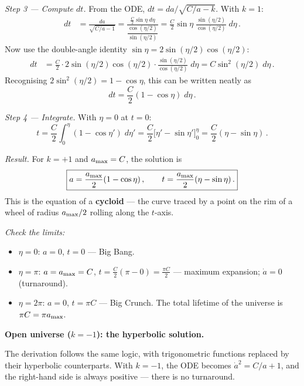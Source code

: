 \medskip\noindent\emph{Step 3 --- Compute $dt$.} From the ODE, $dt = da/\sqrt{C/a-k}$. With $k=1$:
\begin{align}
    dt &= \frac{da}{\sqrt{C/a-1}}
    = \frac{\frac{C}{2}\sin\eta\;d\eta}{\dfrac{\cos(\eta/2)}{\sin(\eta/2)}}
    = \frac{C}{2}\sin\eta\;\frac{\sin(\eta/2)}{\cos(\eta/2)}\;d\eta\,.
\end{align}
Now use the double-angle identity $\sin\eta = 2\sin(\eta/2)\cos(\eta/2)$:
\begin{align}
    dt &= \frac{C}{2}\cdot 2\sin(\eta/2)\cos(\eta/2)\cdot\frac{\sin(\eta/2)}{\cos(\eta/2)}\;d\eta
    = C\sin^2(\eta/2)\;d\eta\,.
\end{align}
Recognising $2\sin^2(\eta/2)=1-\cos\eta$, this can be written neatly as
\begin{equation}
    dt = \frac{C}{2}(1-\cos\eta)\;d\eta\,.
\end{equation}

\medskip\noindent\emph{Step 4 --- Integrate.} With $\eta=0$ at $t=0$:
\begin{equation}
    t = \frac{C}{2}\int_0^{\eta}(1-\cos\eta')\;d\eta' = \frac{C}{2}\bigl[\eta'-\sin\eta'\bigr]_0^{\eta} = \frac{C}{2}(\eta-\sin\eta)\,.
\end{equation}

\medskip\noindent\emph{Result.} For $k=+1$ and $a_{\rm max}=C$, the solution is
\begin{equation}
\boxed{
    a = \frac{a_{\rm max}}{2}(1-\cos\eta)\,,\qquad
    t = \frac{a_{\rm max}}{2}(\eta-\sin\eta)\,.}
    \label{eq:cycloid}
\end{equation}
This is the equation of a \textbf{cycloid} --- the curve traced by a point on the rim of a wheel of radius $a_{\rm max}/2$ rolling along the $t$-axis.

\medskip\noindent\emph{Check the limits:}
\begin{itemize}
    \item $\eta=0$: $a=0$, $t=0$ --- Big Bang.
    \item $\eta=\pi$: $a=a_{\rm max}=C$, $t=\frac{C}{2}(\pi-0)=\frac{\pi C}{2}$ --- maximum expansion; $\dot{a}=0$ (turnaround).
    \item $\eta=2\pi$: $a=0$, $t=\pi C$ --- Big Crunch. The total lifetime of the universe is $\pi C = \pi a_{\rm max}$.
\end{itemize}

\medskip\noindent\textbf{Open universe ($k=-1$): the hyperbolic solution.}

\medskip\noindent The derivation follows the same logic, with trigonometric functions replaced by their hyperbolic counterparts. With $k=-1$, the ODE becomes $\dot{a}^2=C/a+1$, and the right-hand side is always positive --- there is no turnaround.

